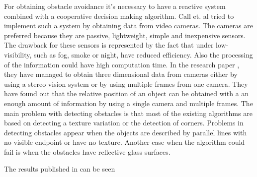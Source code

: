For obtaining obstacle avoidance it's necessary to have a reactive system combined
with a cooperative decision making algorithm. Call et. al tried to implement
such a system by obtaining data from video cameras. The cameras are preferred
because they are passive,  lightweight,  simple and inexpensive sensors. The
drawback for these sensors is represented by the fact that under low-visibility, 
such as fog, smoke or night, have reduced efficiency. Also the processing of the
information could have high computation time. In the research paper \cite{tracking}, 
they have managed to obtain three dimensional data from cameras either by using
a stereo vision system or by using multiple frames from one camera. They have
found out that the relative position of an object can be obtained with a an
enough amount of information by using a single camera and multiple frames. The 
main problem with detecting obstacles is that most of the existing algorithms 
are based on detecting a texture variation or the detection of corners. Problems
in detecting obstacles appear when the objects are described by parallel lines 
with no visible endpoint or have no texture. Another case when the algorithm could
fail is when the obstacles have reflective glass surfaces.

The results published in \cite{tracking} can be seen 

\newpage

